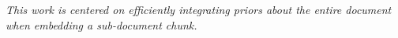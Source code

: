 \noindent\textit{This work is centered on efficiently integrating priors about the entire document when embedding a sub-document chunk.}









